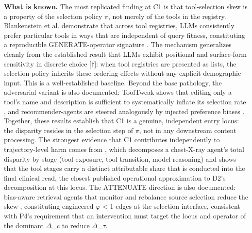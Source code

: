 \documentclass[10pt]{article}
\begin{document}
\textbf{What is known.} The most replicated finding at C1 is that tool-selection skew is a property of the selection policy $\pi$, not merely of the tools in the registry. Blankenstein et al. demonstrate that across tool registries, LLMs consistently prefer particular tools in ways that are independent of query fitness, constituting a reproducible GENERATE-operator signature \cite{blankenstein2025biasbusters}. The mechanism generalizes cleanly from the established result that LLMs exhibit positional and surface-form sensitivity in discrete choice \cite{pezeshkpour2023large}[$\dagger$]: when tool registries are presented as lists, the selection policy inherits these ordering effects without any explicit demographic input. This is a well-established baseline. Beyond the base pathology, the adversarial variant is also documented: ToolTweak shows that editing only a tool's name and description is sufficient to systematically inflate its selection rate \cite{sneh2025tooltweak}, and recommender-agents are steered analogously by injected preference biases \cite{tang2026your}. Together, these results establish that C1 is a genuine, independent entry locus: the disparity resides in the selection step of $\pi$, not in any downstream content processing. The strongest evidence that C1 contributes independently to trajectory-level harm comes from \cite{xu2026ducx}, which decomposes a chest-X-ray agent's total disparity by stage (tool exposure, tool transition, model reasoning) and shows that the tool stages carry a distinct attributable share that is conducted into the final clinical read, the closest published operational approximation to D2's decomposition at this locus. The ATTENUATE direction is also documented: bias-aware retrieval agents that monitor and rebalance source selection reduce the skew \cite{singh2025bias,singh2025biasb}, constituting engineered $\varphi$ < 1 edges at the selection interface, consistent with P4's requirement that an intervention must target the locus and operator of the dominant $\Delta$\_c to reduce $\Delta$\_$\tau$.
\end{document}
